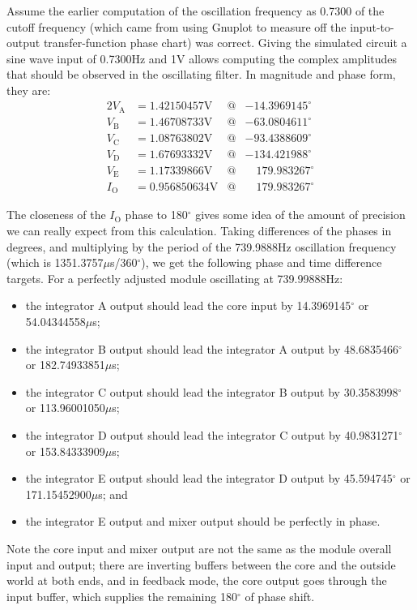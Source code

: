 Assume the earlier computation of the oscillation frequency as 0.7300 of the
cutoff frequency (which came from using Gnuplot to measure off the
input-to-output transfer-function phase chart) was correct.  Giving the
simulated circuit a sine wave input of 0.7300Hz and 1V allows computing the
complex amplitudes that should be observed in the oscillating filter.  In
magnitude and phase form, they are:
\begin{alignat*}{2}
  V_\textrm{A} &= 1.42150457\textrm{V}&@&-14.3969145^\circ \\
  V_\textrm{B} &= 1.46708733\textrm{V}&@&-63.0804611^\circ \\
  V_\textrm{C} &= 1.08763802\textrm{V}&@&-93.4388609^\circ \\
  V_\textrm{D} &= 1.67693332\textrm{V}&@&-134.421988^\circ \\
  V_\textrm{E} &= 1.17339866\textrm{V}&@&\quad 179.983267^\circ \\
  I_\textrm{O} &= 0.956850634\textrm{V}&@&\quad179.983267^\circ
\end{alignat*}

The closeness of the $I_\textrm{O}$ phase to 180$^\circ$ gives some idea of
the amount of precision we can really expect from this calculation.  Taking
differences of the phases in degrees, and multiplying by the period of the
739.9888Hz oscillation frequency (which is 1351.3757$\mu$s/360$^\circ$), we
get the following phase and time difference targets.  For a perfectly
adjusted module oscillating at 739.99888Hz:
\begin{itemize}
  \item the integrator A output should lead the core input by
    14.3969145$^\circ$ or 54.04344558$\mu$s;
  \item the integrator B output should lead the integrator A output by
    48.6835466$^\circ$ or 182.74933851$\mu$s;
  \item the integrator C output should lead the integrator B output by
    30.3583998$^\circ$ or 113.96001050$\mu$s;
  \item the integrator D output should lead the integrator C output by
    40.9831271$^\circ$ or 153.84333909$\mu$s;
  \item the integrator E output should lead the integrator D output by
    45.594745$^\circ$ or 171.15452900$\mu$s; and
  \item the integrator E output and mixer output should be perfectly in
    phase.
\end{itemize}

Note the core input and mixer output are not the same as the module overall
input and output; there are inverting buffers between the core and the
outside world at both ends, and in feedback mode, the core output goes
through the input buffer, which supplies the remaining 180$^\circ$ of phase
shift.

